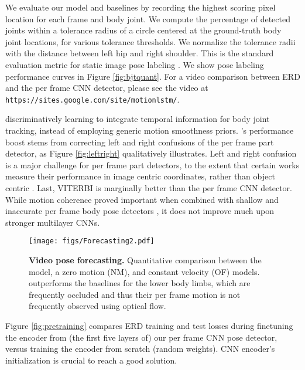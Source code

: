 \documentclass[10pt,twocolumn,letterpaper]{article}
\begin{document}
We evaluate our model and baselines by recording the highest scoring pixel location for each frame and  body joint. We compute the percentage of detected joints within a tolerance radius of a circle centered at the ground-truth body joint locations, for various  tolerance thresholds. We normalize the tolerance radii with the distance between left hip and right shoulder. This is the standard evaluation metric for static image pose labeling \cite{MODEC}. We show pose labeling performance curves  in Figure \ref{fig:bjtquant}. For a video comparison between ERD and the per frame CNN detector, please see the video at { \tt https://sites.google.com/site/motionlstm/}.




discriminatively learning to integrate temporal information  for body joint tracking, instead of employing generic motion smoothness priors.  's performance boost stems from correcting left and right confusions of the per frame part detector, as Figure \ref{fig:leftright} qualitatively illustrates.  
Left and right confusion is a major challenge for per frame part detectors, to the extent that certain works measure their performance in image centric coordinates, rather than object centric 
\cite{YangR_CVPR_2011,MODEC}. Last, VITERBI is marginally better than the per frame CNN detector. While motion coherence proved important when combined with shallow and inaccurate per frame body pose detectors \cite{DBLP:conf/iccv/ParkR11,Batra:2012:DMS:2403138.2403140}, it does not improve much upon stronger  multilayer CNNs.


\begin{figure*}[ht]
\begin{center}
\texttt{[image: figs/Forecasting2.pdf]}
\end{center}
\caption{ \textbf{Video pose forecasting.} Quantitative comparison between the  model, a zero motion (NM), and constant velocity (OF) models.  outperforms the baselines for the lower body limbs, which are frequently occluded and thus their per frame motion is not frequently observed using optical flow. }
\label{fig:forecasting}
\end{figure*}


Figure \ref{fig:pretraining} compares ERD training and test losses during finetuning  the encoder from (the first five layers of) our  per frame CNN pose detector, versus training the encoder from scratch (random weights). CNN encoder's  initialization is crucial to reach a good solution.  
\end{document}
